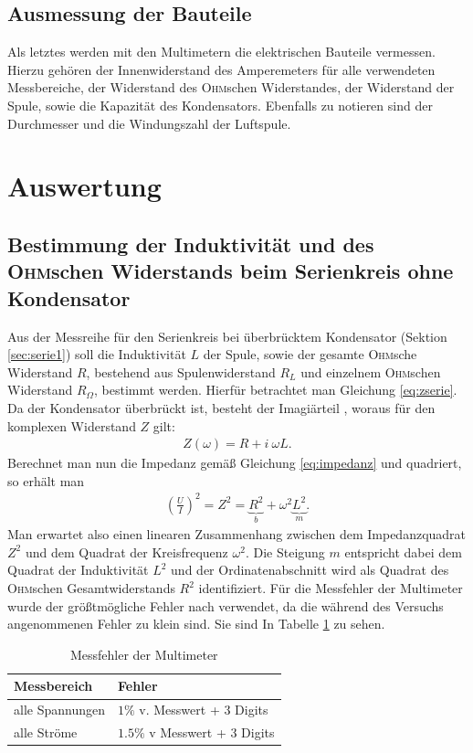 \documentclass[12pt,a4paper,titlepage,headinclude]{scrartcl}
\numberwithin{equation}{section}
\newcommand{\person}[1]{\textsc{#1}}
\begin{document}
\subsection{Ausmessung der Bauteile}
Als letztes werden mit den Multimetern die elektrischen Bauteile vermessen. Hierzu gehören der Innenwiderstand des Amperemeters für alle verwendeten Messbereiche, der Widerstand des \person{Ohm}schen Widerstandes, der Widerstand der Spule, sowie die Kapazität des Kondensators. Ebenfalls zu notieren sind der Durchmesser und die Windungszahl der Luftspule.
\section{Auswertung}
\label{sec:auswertung}
\subsection{Bestimmung der Induktivität und des \person{Ohm}schen Widerstands beim Serienkreis ohne Kondensator}
Aus der Messreihe für den Serienkreis bei überbrücktem Kondensator (Sektion \ref{sec:serie1}) soll die Induktivität $L$ der Spule, sowie der gesamte \person{Ohm}sche Widerstand $R$, bestehend aus Spulenwiderstand $R_L$ und einzelnem \person{Ohm}schen Widerstand $R_\Omega$, bestimmt werden. Hierfür betrachtet man Gleichung \eqref{eq:zserie}. Da der Kondensator überbrückt ist, besteht der Imagiärteil  , woraus für den komplexen Widerstand $Z$ gilt:
\begin{align}
	Z(\omega)=R+i~\omega L.
	\label{eq:impedRL}
\end{align}
Berechnet man nun die Impedanz gemäß Gleichung \eqref{eq:impedanz} und quadriert, so erhält man
\begin{align}
	\left( \frac{U}{I} \right)^2=Z^2=\underbrace{R^2}_b+\omega^2 \underbrace{L^2}_m.
	\label{eq:gerade}
\end{align}
Man erwartet also einen linearen Zusammenhang zwischen dem Impedanzquadrat $Z^2$ und dem Quadrat der Kreisfrequenz $\omega^2$. Die Steigung $m$ entspricht dabei dem Quadrat der Induktivität $L^2$ und der Ordinatenabschnitt wird als Quadrat des \person{Ohm}schen Gesamtwiderstands $R^2$ identifiziert.
Für die Messfehler der Multimeter wurde der größtmögliche Fehler nach \cite[35]{prakti} verwendet, da die während des Versuchs angenommenen Fehler zu klein sind. Sie sind In Tabelle \ref{tab:messfehler} zu sehen.
\begin{table}
	\centering
	\begin{tabular}{l|l}
		\hline
		Messbereich&Fehler\\\hline
		alle Spannungen&$1\%$ v. Messwert + 3 Digits\\
		alle Ströme&$1.5\%$ v Messwert + 3 Digits\\\hline
	\end{tabular}
	\caption{Messfehler der Multimeter}
	\label{tab:messfehler}
\end{table}
\end{document}

